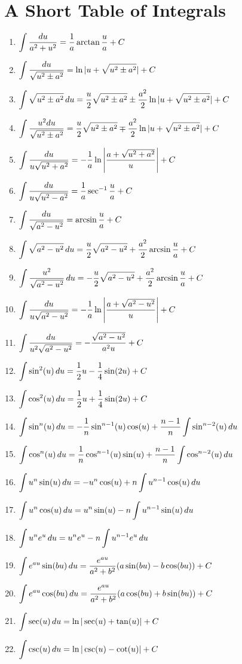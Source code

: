 \chapter{A Short Table of Integrals} \label{C:9.IntegralTable}

\bigskip  

\begin{enumerate}[1)]
\item  $\displaystyle \int \frac{du}{a^2 + u^2} =  \frac{1}{a} \arctan \frac{u}{a} + C$ 
\item $\displaystyle \int \frac{du}{\sqrt{u^2 \pm a^2}} = \ln |u + \sqrt{u^2 \pm a^2}| + C$ 
\item $\displaystyle \int \sqrt{u^2 \pm a^2} \, du = \frac{u}{2}\sqrt{u^2 \pm a^2} \pm \frac{a^2}{2}\ln|u + \sqrt{u^2 \pm a^2}| + C $ 
\item $\displaystyle \int \frac{u^2 du}{\sqrt{u^2 \pm a^2}} = \frac{u}{2}\sqrt{u^2 \pm a^2} \mp \frac{a^2}{2}\ln|u + \sqrt{u^2 \pm a^2}| + C  $ 
\item $\displaystyle \int \frac{du}{u\sqrt{u^2+a^2}} = -\frac{1}{a} \ln \left| \frac{a+\sqrt{u^2 + a^2}}{u} \right| + C $ 
\item $\displaystyle \int \frac{du}{u\sqrt{u^2-a^2}} = \frac{1}{a} \sec^{-1} \frac{u}{a} + C$ 
\item $\displaystyle \int \frac{du}{\sqrt{a^2 - u^2}} =  \arcsin \frac{u}{a} + C$ 
\item $\displaystyle \int \sqrt{a^2 - u^2} \, du = \frac{u}{2}\sqrt{a^2 - u^2} + \frac{a^2}{2} \arcsin \frac{u}{a} + C$ 
\item $\displaystyle \int \frac{u^2}{\sqrt{a^2 - u^2}} \, du = -\frac{u}{2}\sqrt{a^2 - u^2} + \frac{a^2}{2} \arcsin \frac{u}{a} + C$ 
\item $\displaystyle \int \frac{du}{u\sqrt{a^2 - u^2}}  = -\frac{1}{a} \ln \left| \frac{a + \sqrt{a^2 - u^2}}{u} \right| + C$ 
\item $\displaystyle \int \frac{du}{u^2\sqrt{a^2 - u^2}}  = -\frac{\sqrt{a^2-u^2}}{a^2 u} + C$ 
\item $\displaystyle \int \sin^2(u) \, du = \frac{1}{2}u - \frac{1}{4} \sin(2u) + C$ 
\item $\displaystyle \int \cos^2(u) \, du = \frac{1}{2}u + \frac{1}{4} \sin(2u) + C$ 
\item $\displaystyle \int \sin^n(u) \, du = -\frac{1}{n}\sin^{n-1}(u) \cos(u) + \frac{n-1}{n} \int \sin^{n-2}(u) \, du$ 
\item $\displaystyle \int \cos^n(u) \, du = \frac{1}{n}\cos^{n-1}(u) \sin(u) + \frac{n-1}{n} \int \cos^{n-2}(u) \, du$ 
\item $\displaystyle \int u^n \sin(u) \, du = -u^n \cos(u) + n \int u^{n-1} \cos(u) \, du$ 
\item $\displaystyle \int u^n \cos(u) \, du = u^n \sin(u) - n \int u^{n-1} \sin(u) \, du$ 
\item $\displaystyle \int u^n e^u \, du = u^n e^u - n \int u^{n-1} e^u \, du $ 
\item $\displaystyle \int e^{au} \sin (bu) \, du = \frac{e^{au}}{a^2 + b^2} (a \sin (bu) - b \cos (bu)) + C$ 
\item $\displaystyle \int e^{au} \cos (bu) \, du = \frac{e^{au}}{a^2 + b^2} (a \cos (bu) + b \sin (bu)) + C$ 
\item $\displaystyle \int \sec(u) \, du = \ln | \sec(u) + \tan(u) | + C$ 
\item $\displaystyle \int \csc(u) \, du = \ln | \csc(u) - \cot(u) | + C$ 
\end{enumerate}